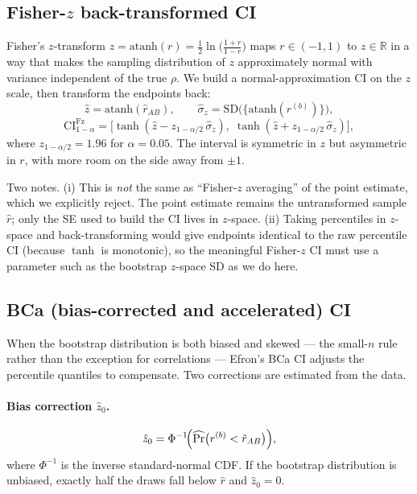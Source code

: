 \documentclass[11pt]{article}
\begin{document}
\subsection{Fisher-$z$ back-transformed CI}
\label{sec:ci-fisherz}
Fisher's $z$-transform $z = \mathrm{atanh}(r) = \tfrac{1}{2}\ln\!\bigl(\tfrac{1+r}{1-r}\bigr)$ maps $r \in (-1, 1)$ to $z \in \mathbb{R}$ in a way that makes the sampling distribution of $z$ approximately normal with variance independent of the true $\rho$. We build a normal-approximation CI on the $z$ scale, then transform the endpoints back:
\begin{equation}
\hat z = \mathrm{atanh}(\hat r_{AB}), \qquad \hat\sigma_z = \mathrm{SD}\!\bigl(\{\mathrm{atanh}(r^{(b)})\}\bigr),
\end{equation}
\begin{equation}
\mathrm{CI}^{\mathrm{Fz}}_{1-\alpha} = \bigl[\tanh(\hat z - z_{1-\alpha/2}\,\hat\sigma_z),\; \tanh(\hat z + z_{1-\alpha/2}\,\hat\sigma_z)\bigr],
\label{eq:ci-fz}
\end{equation}
where $z_{1-\alpha/2} = 1.96$ for $\alpha = 0.05$. The interval is symmetric in $z$ but asymmetric in $r$, with more room on the side away from $\pm 1$.

Two notes. (i) This is \emph{not} the same as ``Fisher-$z$ averaging'' of the point estimate, which we explicitly reject. The point estimate remains the untransformed sample $\hat r$; only the SE used to build the CI lives in $z$-space. (ii) Taking percentiles in $z$-space and back-transforming would give endpoints identical to the raw percentile CI (because $\tanh$ is monotonic), so the meaningful Fisher-$z$ CI must use a parameter such as the bootstrap $z$-space SD as we do here.

\subsection{BCa (bias-corrected and accelerated) CI}
\label{sec:ci-bca}
When the bootstrap distribution is both biased and skewed --- the small-$n$ rule rather than the exception for correlations --- Efron's BCa CI adjusts the percentile quantiles to compensate. Two corrections are estimated from the data.

\paragraph{Bias correction $\hat z_0$.}
\begin{equation}
\hat z_0 = \Phi^{-1}\!\Bigl(\widehat{\Pr}\bigl(r^{(b)} < \hat r_{AB}\bigr)\Bigr),
\label{eq:bca-z0}
\end{equation}
where $\Phi^{-1}$ is the inverse standard-normal CDF. If the bootstrap distribution is unbiased, exactly half the draws fall below $\hat r$ and $\hat z_0 = 0$.
\end{document}

